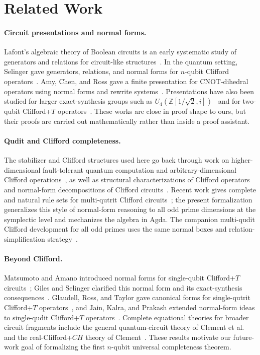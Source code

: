 \documentclass[acmsmall,screen,review,anonymous]{acmart}
\newcommand{\Agda}{Agda\xspace}
\begin{document}
\section{Related Work}
\label{sec:related}

\paragraph{Circuit presentations and normal forms.}
Lafont's algebraic theory of Boolean circuits is an early systematic study of
generators and relations for circuit-like structures~\cite{Lafont2003}. In the
quantum setting, Selinger gave generators, relations, and normal forms for
\(n\)-qubit Clifford operators~\cite{Selinger2015}. Amy, Chen, and Ross gave a
finite presentation for CNOT-dihedral operators using normal forms and rewrite
systems~\cite{AmyChenRoss2018}. Presentations have also been studied for
larger exact-synthesis groups such as
\(U_4(\mathbb{Z}[1/\sqrt{2},i])\)~\cite{Greylyn2014} and for two-qubit
Clifford+\(T\) operators~\cite{BianSelinger2022}. These works are close in
proof shape to ours, but their proofs are carried out mathematically rather
than inside a proof assistant.

\paragraph{Qudit and Clifford completeness.}
The stabilizer and Clifford structures used here go back through work on
higher-dimensional fault-tolerant quantum computation and arbitrary-dimensional
Clifford operations~\cite{Gottesman1999,HostensDehaeneDeMoor2005}, as well as
structural characterizations of Clifford operators~\cite{Farinholt2014} and
normal-form decompositions of Clifford circuits~\cite{BravyiMaslov2021}. Recent
work gives complete and natural rule sets for multi-qutrit Clifford
circuits~\cite{LiMoscaRossVanDeWeteringZhao2025Qutrit}; the present
formalization generalizes this style of normal-form reasoning to all odd prime
dimensions at the symplectic level and mechanizes the algebra in \Agda. The
companion multi-qudit Clifford development for all odd primes uses the same
normal boxes and relation-simplification
strategy~\cite{BianLiRossVandeWeteringZhaoQudit}.

\paragraph{Beyond Clifford.}
Matsumoto and Amano introduced normal forms for single-qubit Clifford+\(T\)
circuits~\cite{MatsumotoAmano2008}; Giles and Selinger clarified this normal
form and its exact-synthesis consequences~\cite{GilesSelinger2013}. Glaudell,
Ross, and Taylor gave canonical forms for single-qutrit Clifford+\(T\)
operators~\cite{GlaudellRossTaylor2018}, and Jain, Kalra, and Prakash extended
normal-form ideas to single-qudit Clifford+\(T\)
operators~\cite{JainKalraPrakash2020}. Complete equational theories for
broader circuit fragments include the general quantum-circuit theory of Clement
et al.~\cite{ClementEtAl2022} and the real-Clifford+\(CH\) theory of
Clement~\cite{Clement2026RealCH}. These results motivate our future-work goal
of formalizing the first \(n\)-qubit universal completeness theorem.
\end{document}
